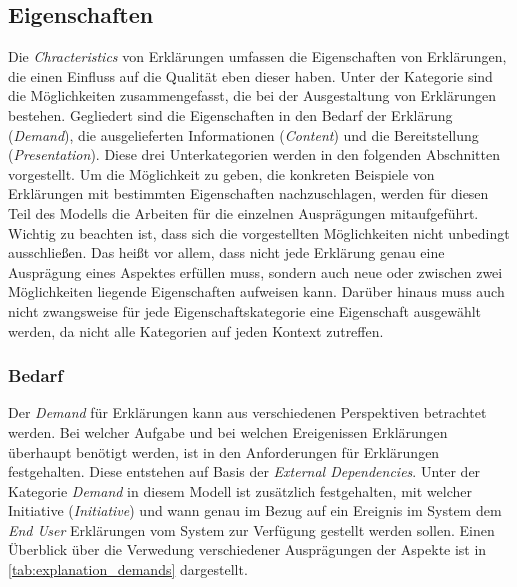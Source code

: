 \subsection{Eigenschaften}

Die \textit{Chracteristics} von Erklärungen umfassen die Eigenschaften von Erklärungen, die einen Einfluss auf die Qualität eben dieser haben. Unter der Kategorie sind die Möglichkeiten zusammengefasst, die bei der Ausgestaltung von Erklärungen bestehen. Gegliedert sind die Eigenschaften in den Bedarf der Erklärung (\textit{Demand}), die ausgelieferten Informationen (\textit{Content}) und die Bereitstellung (\textit{Presentation}). Diese drei Unterkategorien werden in den folgenden Abschnitten vorgestellt. Um die Möglichkeit zu geben, die konkreten Beispiele von Erklärungen mit bestimmten Eigenschaften nachzuschlagen, werden für diesen Teil des Modells die Arbeiten für die einzelnen Ausprägungen mitaufgeführt.  Wichtig zu beachten ist, dass sich die vorgestellten Möglichkeiten nicht unbedingt ausschließen. Das heißt vor allem, dass nicht jede Erklärung genau eine Ausprägung eines Aspektes erfüllen muss, sondern auch neue oder zwischen zwei Möglichkeiten liegende Eigenschaften aufweisen kann. Darüber hinaus muss auch nicht zwangsweise für jede Eigenschaftskategorie eine Eigenschaft ausgewählt werden, da nicht alle Kategorien auf jeden Kontext zutreffen.

\subsubsection{Bedarf}

Der \textit{Demand}  für Erklärungen kann aus verschiedenen Perspektiven betrachtet werden. Bei welcher Aufgabe und bei welchen Ereigenissen Erklärungen überhaupt benötigt werden, ist in den Anforderungen für Erklärungen festgehalten. Diese entstehen auf Basis der \textit{External Dependencies}. Unter der Kategorie \textit{Demand} in diesem Modell ist zusätzlich festgehalten, mit welcher Initiative (\textit{Initiative}) und wann genau im Bezug auf ein Ereignis im System dem \textit{End User} Erklärungen vom System zur Verfügung gestellt werden sollen. Einen Überblick über die Verwedung verschiedener Ausprägungen der Aspekte ist in \autoref{tab:explanation_demands} dargestellt.

